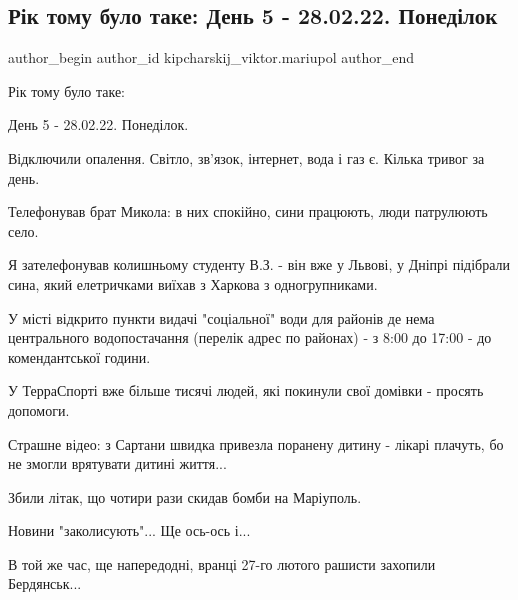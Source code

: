 





\subsection{Рік тому  було таке:  День 5 - 28.02.22. Понеділок}
\label{sec:28_02_2023.fb.kipcharskij_viktor.mariupol.1.r_k_tomu__bulo_take_}

\ifcmt
 author_begin
   author_id kipcharskij_viktor.mariupol
 author_end
\fi

Рік тому  було таке:

День 5 - 28.02.22. Понеділок.

Відключили опалення. Світло, зв'язок, інтернет, вода і газ є. Кілька тривог за
день.

Телефонував брат Микола: в них спокійно, сини працюють, люди патрулюють село.

Я зателефонував колишньому студенту В.З. - він вже у Львові, у Дніпрі підібрали
сина, який елетричками виїхав з Харкова з одногрупниками.

У місті відкрито пункти видачі "соціальної" води для районів де нема
центрального водопостачання (перелік адрес по районах) - з 8:00  до 17:00 - до
комендантської години.

У ТерраСпорті вже більше тисячі людей, які покинули свої домівки - просять
допомоги.

Страшне відео: з Сартани швидка привезла поранену дитину - лікарі плачуть, бо
не змогли врятувати дитині життя...

Збили літак, що чотири рази скидав бомби на Маріуполь.

Новини "заколисують"... Ще ось-ось і...

В той же час, ще напередодні, вранці 27-го лютого рашисти захопили Бердянськ...

